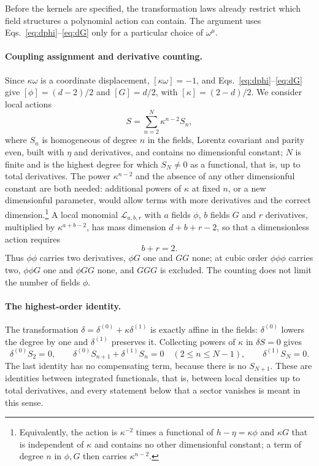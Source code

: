 \documentclass[prd,aps,preprint,nofootinbib,amsmath,amssymb,eqsecnum]{revtex4-2}
\begin{document}
Before the kernels are specified, the transformation laws already restrict which field
structures a polynomial action can contain. The argument uses
Eqs.~\eqref{eq:dphi}--\eqref{eq:dG} only for a particular choice of $\omega^\mu$.

\paragraph{Coupling assignment and derivative counting.} Since $\kappa\omega$ is a
coordinate displacement, $[\kappa\omega]=-1$, and Eqs.~\eqref{eq:dphi}--\eqref{eq:dG} give
$[\phi]=(d-2)/2$ and $[G]=d/2$, with $[\kappa]=(2-d)/2$. We consider local actions
\begin{equation}
S=\sum_{n=2}^{N}\kappa^{n-2}S_n ,
\label{eq:polyaction}
\end{equation}
where $S_n$ is homogeneous of degree $n$ in the fields, Lorentz covariant and parity even,
built with $\eta$ and derivatives, and contains no dimensionful constant; $N$ is finite and
is the highest degree for which $S_N\neq0$ as a functional, that is, up to total
derivatives. The
power $\kappa^{n-2}$ and the absence of any other dimensionful constant are both needed:
additional powers of $\kappa$ at fixed $n$, or a new dimensionful parameter, would allow
terms with more derivatives and the correct dimension.\footnote{Equivalently, the action is
$\kappa^{-2}$ times a functional of $h-\eta=\kappa\phi$ and $\kappa G$ that is independent of
$\kappa$ and contains no other dimensionful constant; a term of degree $n$ in $\phi,G$ then
carries $\kappa^{n-2}$.}
A local monomial $\mathcal L_{a,b,r}$ with $a$ fields $\phi$, $b$ fields $G$ and $r$
derivatives, multiplied by $\kappa^{a+b-2}$, has mass dimension $d+b+r-2$, so that a
dimensionless action requires
\begin{equation}
b+r=2 .
\label{eq:counting}
\end{equation}
Thus $\phi\phi$ carries two derivatives, $\phi G$ one and $GG$ none; at cubic order
$\phi\phi\phi$ carries two, $\phi\phi G$ one and $\phi GG$ none, and $GGG$ is excluded. The
counting does not limit the number of fields $\phi$.

\paragraph{The highest-order identity.} The transformation $\delta=\delta^{(0)}+\kappa\delta^{(1)}$
is exactly affine in the fields: $\delta^{(0)}$ lowers the degree by one and $\delta^{(1)}$
preserves it. Collecting powers of $\kappa$ in $\delta S=0$ gives
\begin{equation}
\delta^{(0)}S_2=0,\qquad
\delta^{(0)}S_{n+1}+\delta^{(1)}S_n=0\quad(2\le n\le N-1),\qquad
\delta^{(1)}S_N=0 .
\label{eq:hierarchy}
\end{equation}
The last identity has no compensating term, because there is no $S_{N+1}$. These are
identities between integrated functionals, that is, between local densities up to total
derivatives, and every statement below that a sector vanishes is meant in this sense.
\end{document}
